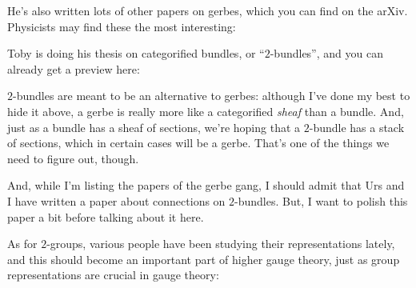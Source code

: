 \documentclass{article}
\def\tightlist{}
\renewcommand{\texttt}[1]{%
  \begingroup
  \ttfamily
  \begingroup\lccode`~=`/\lowercase{\endgroup\def~}{/\discretionary{}{}{}}%
  \begingroup\lccode`~=`[\lowercase{\endgroup\def~}{[\discretionary{}{}{}}%
  \begingroup\lccode`~=`.\lowercase{\endgroup\def~}{.\discretionary{}{}{}}%
  \catcode`/=\active\catcode`[=\active\catcode`.=\active
  \scantokens{#1\noexpand}%
  \endgroup
}
\begin{document}
He's also written lots of other papers on gerbes, which you can find on
the arXiv. Physicists may find these the most interesting:


Toby is doing his thesis on categorified bundles, or ``\(2\)-bundles'',
and you can already get a preview here:


\(2\)-bundles are meant to be an alternative to gerbes: although I've
done my best to hide it above, a gerbe is really more like a
categorified \emph{sheaf} than a bundle. And, just as a bundle has a
sheaf of sections, we're hoping that a \(2\)-bundle has a stack of
sections, which in certain cases will be a gerbe. That's one of the
things we need to figure out, though.

And, while I'm listing the papers of the gerbe gang, I should admit that
Urs and I have written a paper about connections on \(2\)-bundles. But,
I want to polish this paper a bit before talking about it here.

As for \(2\)-groups, various people have been studying their
representations lately, and this should become an important part of
higher gauge theory, just as group representations are crucial in gauge
theory:
\end{document}

